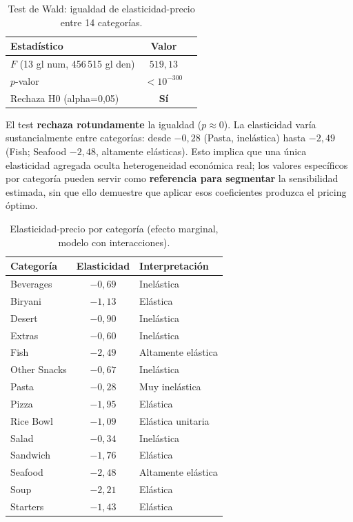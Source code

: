 \documentclass[doc, a4paper, biblatex, floatsintext, longtable, babel]{apa7}
\begin{document}
\begin{table}[!htbp]
\centering
\caption{Test de Wald: igualdad de elasticidad-precio entre 14 categorías.}
\label{tab:wald_categoria}
\begin{tabular}{lcp{4.5cm}}
\toprule
Estadístico & Valor \\
\midrule
$F$ (13 gl num, 456\,515 gl den) & $519,13$ \\
$p$-valor & $< 10^{-300}$ \\
Rechaza H0 (alpha=0,05) & \textbf{Sí} \\
\bottomrule
\end{tabular}
\end{table}

El test \textbf{rechaza rotundamente} la igualdad ($p \approx 0$). La elasticidad varía sustancialmente entre categorías: desde \textbf{$-0,28$} (Pasta, inelástica) hasta \textbf{$-2,49$} (Fish; Seafood $-2,48$, altamente elásticas). Esto implica que una única elasticidad agregada oculta heterogeneidad económica real; los valores específicos por categoría pueden servir como \textbf{referencia para segmentar} la sensibilidad estimada, sin que ello demuestre que aplicar esos coeficientes produzca el pricing óptimo.

\begin{table}[!htbp]
\centering
\caption{Elasticidad-precio por categoría (efecto marginal, modelo con interacciones).}
\label{tab:elasticidad_por_categoria}
\begin{tabular}{lcp{4.5cm}}
\toprule
Categoría & Elasticidad & Interpretación \\
\midrule
Beverages & $-0,69$ & Inelástica \\
Biryani & $-1,13$ & Elástica \\
Desert & $-0,90$ & Inelástica \\
Extras & $-0,60$ & Inelástica \\
Fish & $-2,49$ & Altamente elástica \\
Other Snacks & $-0,67$ & Inelástica \\
Pasta & $-0,28$ & Muy inelástica \\
Pizza & $-1,95$ & Elástica \\
Rice Bowl & $-1,09$ & Elástica unitaria \\
Salad & $-0,34$ & Inelástica \\
Sandwich & $-1,76$ & Elástica \\
Seafood & $-2,48$ & Altamente elástica \\
Soup & $-2,21$ & Elástica \\
Starters & $-1,43$ & Elástica \\
\bottomrule
\end{tabular}
\end{table}
\end{document}
